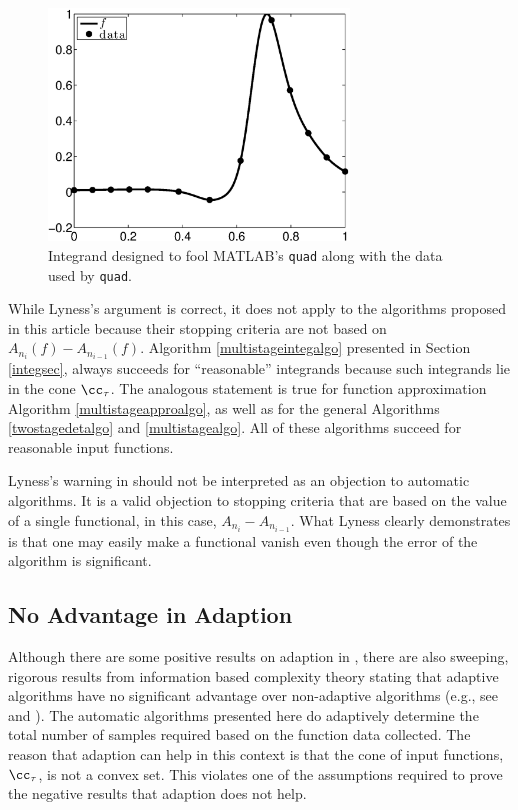 \documentclass[]{elsarticle}
\theoremstyle{definition}
\theoremstyle{remark}
\begin{document}
\begin{figure}
\centering 
\includegraphics[width=8cm]{foolbwquadexample.eps}
\caption{Integrand designed to fool MATLAB's {\tt quad} along with the data used by {\tt quad}. \label{fig:foolquad}}
\end{figure}

While Lyness's argument is correct, it does not apply to the algorithms proposed in this article because their stopping criteria are not based on  $A_{n_{i}}(f)-A_{n_{i-1}}(f)$.  Algorithm \ref{multistageintegalgo} presented in Section \ref{integsec}, always succeeds for ``reasonable'' integrands because such integrands lie in the cone $\cc_{\tau}$.  The analogous statement is true for function approximation Algorithm \ref{multistageapproalgo}, as well as for the general Algorithms \ref{twostagedetalgo} and \ref{multistagealgo}.  All of these algorithms succeed for reasonable input functions.  

Lyness's warning in \cite{Lyn83} should not be interpreted as an objection to automatic algorithms.  It is a valid objection to stopping criteria that are based on the value of a single functional, in this case, $A_{n_{i}}-A_{n_{i-1}}$.  What Lyness clearly demonstrates is that one may easily make a functional vanish even though the error of the algorithm is significant.

\subsection{No Advantage in Adaption}

Although there are some positive results on adaption in \cite{Nov96a,PlaWas05a,PlaEtal08a}, there are also sweeping, rigorous results from information based complexity theory stating that adaptive algorithms have no significant advantage over non-adaptive algorithms (e.g., see \citep[Chapter 4, Theorem 5.2.1]{TraWasWoz88} and \cite{Nov96a}). The automatic algorithms presented here do adaptively determine the total number of samples required based on the function data collected.  The reason that adaption can help in this context is that the cone of input functions, $\cc_{\tau}$, is not a convex set.  This violates one of the assumptions required to prove the negative results that adaption does not help.
\end{document}
